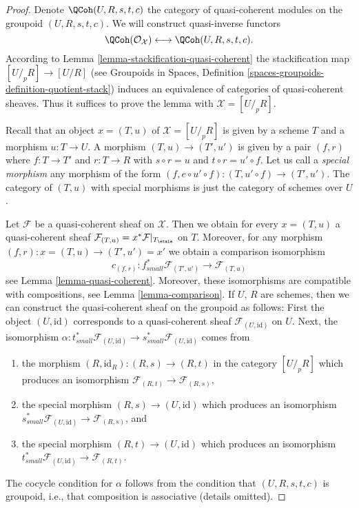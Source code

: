 \begin{proof}
Denote $\QCoh(U, R, s, t, c)$ the category of quasi-coherent modules
on the groupoid $(U, R, s, t, c)$. We will construct quasi-inverse functors
$$
\QCoh(\mathcal{O}_\mathcal{X})
\longleftrightarrow
\QCoh(U, R, s, t, c).
$$
According to
Lemma \ref{lemma-stackification-quasi-coherent}
the stackification map $[U/_{\!p}R] \to [U/R]$ (see
Groupoids in Spaces, Definition
\ref{spaces-groupoids-definition-quotient-stack})
induces an equivalence of categories of quasi-coherent sheaves.
Thus it suffices to prove the lemma with $\mathcal{X} = [U/_{\!p}R]$.

\medskip\noindent
Recall that an object $x = (T, u)$ of $\mathcal{X} = [U/_{\!p}R]$
is given by a scheme $T$ and a morphism $u : T \to U$. A morphism
$(T, u) \to (T', u')$ is given by a pair $(f, r)$ where $f : T \to T'$
and $r : T \to R$ with $s \circ r = u$ and $t \circ r = u' \circ f$.
Let us call a {\it special morphism} any morphism of the form
$(f, e \circ u' \circ f) : (T, u' \circ f) \to (T', u')$.
The category of $(T, u)$ with special morphisms is just the
category of schemes over $U$.

\medskip\noindent
Let $\mathcal{F}$ be a quasi-coherent sheaf on $\mathcal{X}$.
Then we obtain for every $x = (T, u)$ a quasi-coherent sheaf
$\mathcal{F}_{(T, u)} = x^*\mathcal{F}|_{T_\etale}$ on $T$.
Moreover, for any morphism $(f, r) : x = (T, u) \to (T', u') = x'$
we obtain a comparison isomorphism
$$
c_{(f, r)} :
f_{small}^*\mathcal{F}_{(T', u')}
\longrightarrow
\mathcal{F}_{(T, u)}
$$
see Lemma \ref{lemma-quasi-coherent}. Moreover, these isomorphisms are
compatible with compositions, see
Lemma \ref{lemma-comparison}.
If $U$, $R$ are schemes, then we can
construct the quasi-coherent sheaf on the groupoid as follows: First
the object $(U, \text{id})$ corresponds to a quasi-coherent sheaf
$\mathcal{F}_{(U, \text{id})}$ on $U$. Next, the isomorphism
$\alpha : t_{small}^*\mathcal{F}_{(U, \text{id})} \to
s_{small}^*\mathcal{F}_{(U, \text{id})}$
comes from
\begin{enumerate}
\item the morphism $(R, \text{id}_R) : (R, s) \to (R, t)$
in the category $[U/_{\!p}R]$ which produces an isomorphism
$\mathcal{F}_{(R, t)} \to \mathcal{F}_{(R, s)}$,
\item the special morphism $(R, s) \to (U, \text{id})$ which produces an
isomorphism
$s_{small}^*\mathcal{F}_{(U, \text{id})} \to \mathcal{F}_{(R, s)}$, and
\item the special morphism $(R, t) \to (U, \text{id})$ which produces an
isomorphism $t_{small}^*\mathcal{F}_{(U, \text{id})} \to \mathcal{F}_{(R, t)}$.
\end{enumerate}
The cocycle condition for $\alpha$ follows from the condition
that $(U, R, s, t, c)$ is groupoid, i.e., that composition is
associative (details omitted).


\end{proof}

